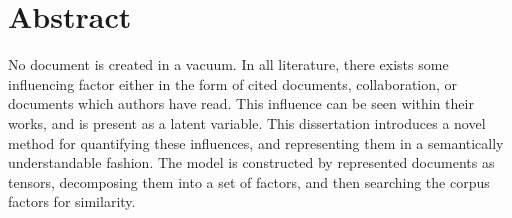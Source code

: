 \chapter*{Abstract}\label{ch:abstract}
No document is created in a vacuum.  In all literature, there exists
some influencing factor either in the form of cited documents,
collaboration, or documents which authors have read.  This influence
can be seen within their works, and is present as a latent variable.
This dissertation introduces a novel method for quantifying these influences,
and representing them in a semantically understandable fashion.  The
model is constructed by represented documents as tensors, decomposing
them into a set of factors, and then searching the corpus factors for
similarity.  

